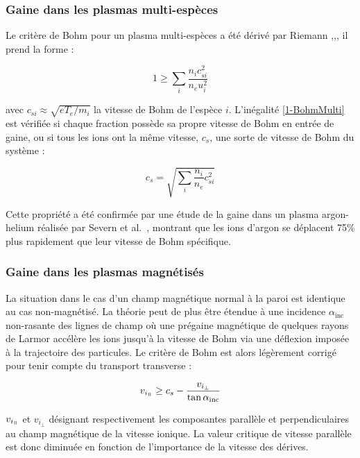 \begin{refsection}
\subsubsection{Gaine dans les plasmas multi-espèces}
Le critère de Bohm pour un plasma multi-espèces a été dérivé par Riemann
\parencite{Riemann95},\parencite{Allen},\parencite{Franklin}, il prend la
forme :

\begin{equation}
\label{1-BohmMulti}
1\geq\sum_i{\frac{n_ic_{si}^2}{n_eu_i^2}}
\end{equation}

avec $c_{si}\approx\sqrt{eT_e/m_i}$ la vitesse de Bohm de l'espèce $i$.
L'inégalité \eqref{1-BohmMulti} est vérifiée si chaque fraction possède sa
propre vitesse de Bohm en entrée de gaine, ou si tous les ions ont la même
vitesse, $c_s$, une sorte de vitesse de Bohm du système :

\begin{equation}
\label{1-BohmSpeed}
c_s=\sqrt{\sum_i\frac{n_i}{n_e}c_{si}^2}
\end{equation}

Cette propriété a été confirmée par une étude de la gaine dans un plasma
argon-helium réalisée par Severn et al.~\parencite{Severn}, montrant que les
ions d'argon se déplacent 75\% plus rapidement que leur vitesse de Bohm
spécifique.

\subsubsection{Gaine dans les plasmas magnétisés}
La situation dans le cas d'un champ magnétique normal à la paroi est
identique au cas non-magnétisé. La théorie peut de plus être étendue 
à une incidence $\alpha_\text{inc}$ non-rasante des lignes de champ où une
prégaine magnétique de quelques rayons de Larmor accélère les ions jusqu'à la
vitesse de Bohm via une déflexion imposée à la trajectoire des particules. Le
critère de Bohm est alors légèrement corrigé pour tenir compte du transport transverse
\cite{Stangeby} :

\begin{equation}
	v_{i_{\para}}\geq
	c_{s}-\frac{v_{i_{\perp}}}{\tan{\alpha_\text{inc}}}
\end{equation}
 
 $v_{i_{\para}}$ et $v_{i_{\perp}}$ désignant respectivement les composantes
 parallèle et perpendiculaires au champ magnétique de la vitesse ionique. La valeur critique
 de vitesse parallèle est donc diminuée en fonction de l'importance de la vitesse des dérives. 
 

\end{refsection}
